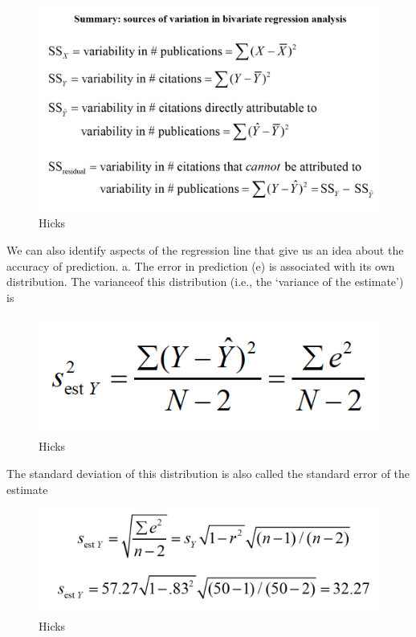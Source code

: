 \documentclass[]{book}
\theoremstyle{definition}
\theoremstyle{definition}
\theoremstyle{definition}
\theoremstyle{remark}
\begin{document}
{\begin{figure}
\centering
\includegraphics{img/hicksreg8.png}
\caption{Hicks}
\end{figure}

We can also identify aspects of the regression line that give us an idea
about the accuracy of prediction. a. The error in prediction (e) is
associated with its own distribution. The varianceof this distribution
(i.e., the `variance of the estimate') is

\begin{figure}
\centering
\includegraphics{img/hicksreg9.png}
\caption{Hicks}
\end{figure}

The standard deviation of this distribution is also called the standard
error of the estimate

\begin{figure}
\centering
\includegraphics{img/hicksreg10.png}
\caption{Hicks}
\end{figure}

}
\end{document}
